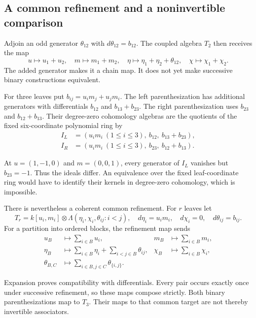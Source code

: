 \subsection{A common refinement and a noninvertible comparison}

Adjoin an odd generator $\theta_{12}$ with
$d\theta_{12}=b_{12}$. The coupled algebra $T_2$ then receives
the map
\[
 u\mapsto u_1+u_2,\quad m\mapsto m_1+m_2,\quad
 \eta\mapsto\eta_1+\eta_2+\theta_{12},\quad
 \chi\mapsto\chi_1+\chi_2.
\]
The added generator makes it a chain map.
It does not yet make successive binary constructions equivalent.

For three leaves put $b_{ij}=u_im_j+u_jm_i$.
The left parenthesization has additional generators with
differentials $b_{12}$ and $b_{13}+b_{23}$.
The right parenthesization uses $b_{23}$ and $b_{12}+b_{13}$.
Their degree-zero cohomology algebras are the quotients of the
fixed six-coordinate polynomial ring by
\begin{equation}\label{cyrec:eq:node-support-ideals}
\begin{aligned}
 I_L&=(u_im_i\ (1\leq i\leq3),\ b_{12},\ b_{13}+b_{23}),\\
 I_R&=(u_im_i\ (1\leq i\leq3),\ b_{23},\ b_{12}+b_{13}).
\end{aligned}
\end{equation}

At $u=(1,-1,0)$ and $m=(0,0,1)$, every generator of $I_L$
vanishes but $b_{23}=-1$. Thus the ideals differ.
An equivalence over the fixed leaf-coordinate ring would have to
identify their kernels in degree-zero cohomology, which is impossible.

There is nevertheless a coherent common refinement. For $r$
leaves let
\[
 T_r=k[u_i,m_i]\otimes
       \Lambda(\eta_i,\chi_i,\theta_{ij}:i<j),
 \quad d\eta_i=u_im_i,\quad d\chi_i=0,\quad d\theta_{ij}=b_{ij}.
\]
For a partition into ordered blocks, the refinement map sends
\begin{equation}\label{cyrec:eq:node-refinements}
\begin{aligned}
 u_B&\mapsto\sum_{i\in B}u_i,&
 m_B&\mapsto\sum_{i\in B}m_i,\\
 \eta_B&\mapsto\sum_{i\in B}\eta_i+
                      \sum_{i<j\in B}\theta_{ij},&
 \chi_B&\mapsto\sum_{i\in B}\chi_i,\\
 \theta_{B,C}&\mapsto\sum_{i\in B,j\in C}\theta_{\{i,j\}}.
\end{aligned}
\end{equation}

Expansion proves compatibility with differentials. Every pair
occurs exactly once under successive refinement, so these maps
compose strictly. Both binary parenthesizations map to $T_3$.
Their maps to that common target are not thereby invertible
associators.

